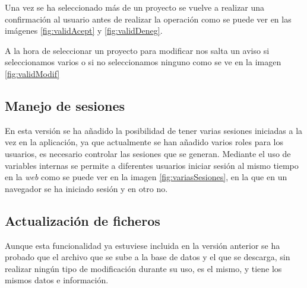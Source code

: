 Una vez se ha seleccionado más de un proyecto se vuelve a realizar una confirmación al usuario antes de realizar la operación como se puede ver en las imágenes \ref{fig:validAcept} y \ref{fig:validDeneg}.


A la hora de seleccionar un proyecto para modificar nos salta un aviso si seleccionamos varios o si no seleccionamos ninguno como se ve en la imagen \ref{fig:validModif}


\subsection{Manejo de sesiones}

En esta versión se ha añadido la posibilidad de tener varias sesiones iniciadas a la vez en la aplicación, ya que actualmente se han añadido varios roles para los usuarios, es necesario controlar las sesiones que se generan. Mediante el uso de variables internas se permite a diferentes usuarios iniciar sesión al mismo tiempo en la \emph{web} como se puede ver en la imagen \ref{fig:variasSesiones}, en la que en un navegador se ha iniciado sesión y en otro no.


\subsection{Actualización de ficheros}

Aunque esta funcionalidad ya estuviese incluida en la versión anterior se ha probado que el archivo que se sube a la base de datos y el que se descarga, sin realizar ningún tipo de modificación durante su uso, es el mismo, y tiene los mismos datos e información.
